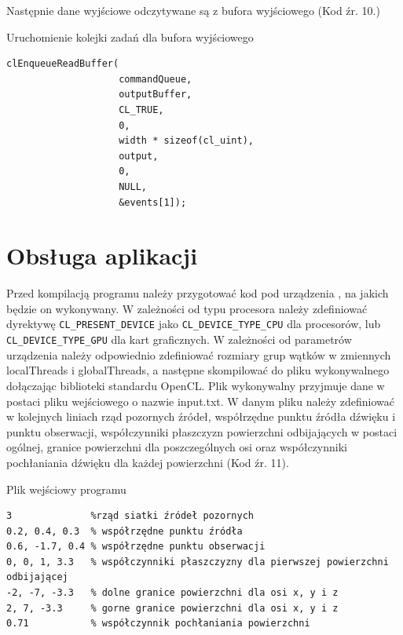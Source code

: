 Następnie dane wyjściowe odczytywane są z bufora wyjściowego (Kod źr. 10.)
\begin{program}
\caption{Uruchomienie kolejki zadań dla bufora wyjściowego}
\begin{lstlisting}
clEnqueueReadBuffer(
                    commandQueue,
                    outputBuffer,
                    CL_TRUE,
                    0,
                    width * sizeof(cl_uint),
                    output,
                    0,
                    NULL,
                    &events[1]);
\end{lstlisting}
\end{program}



\section{Obsługa aplikacji}\label{sec:oa}

Przed kompilacją programu należy przygotować kod pod urządzenia , na jakich  będzie on wykonywany. W zależności od typu procesora należy zdefiniować dyrektywę \verb|CL_PRESENT_DEVICE| jako \verb|CL_DEVICE_TYPE_CPU| dla procesorów, lub \verb|CL_DEVICE_TYPE_GPU| dla kart graficznych. W zależności od parametrów urządzenia należy odpowiednio zdefiniować rozmiary grup wątków w zmiennych localThreads i globalThreads, a następne skompilować do pliku wykonywalnego dołączając biblioteki standardu OpenCL. Plik wykonywalny przyjmuje dane w postaci pliku wejściowego o nazwie input.txt. W danym pliku należy zdefiniować w kolejnych liniach  rząd pozornych źródeł, współrzędne punktu źródła dźwięku i punktu obserwacji, współczynniki płaszczyzn powierzchni odbijających w postaci ogólnej, granice powierzchni dla poszczególnych osi oraz współczynniki pochłaniania dźwięku dla każdej powierzchni (Kod źr. 11).

\begin{program}
\caption{Plik wejściowy programu}
\begin{lstlisting}
3              %rząd siatki źródeł pozornych
0.2, 0.4, 0.3  % współrzędne punktu źródła
0.6, -1.7, 0.4 % współrzędne punktu obserwacji
0, 0, 1, 3.3   % współczynniki płaszczyzny dla pierwszej powierzchni odbijającej 
-2, -7, -3.3   % dolne granice powierzchni dla osi x, y i z 
2, 7, -3.3     % gorne granice powierzchni dla osi x, y i z
0.71           % współczynnik pochłaniania powierzchni
\end{lstlisting}
\end{program}

